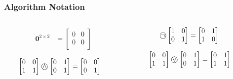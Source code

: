 \documentclass[11pt]{beamer}
\begin{document}
	\begin{frame}
		\frametitle{Algorithm Notation}

		\begin{columns}
			\begin{column}{0.5\textwidth}
				\begin{align*}
					\mathbf{0}^{2\times 2}&=
					\begin{bmatrix}
						0&0\\
						0&0\\
					\end{bmatrix}
				\end{align*}

				\begin{align*}
					\begin{bmatrix}
						0&0\\
						1&1\\
					\end{bmatrix}
					\incircbin{\land}
					\begin{bmatrix}
						0&1\\
						0&1\\
					\end{bmatrix}
					&=
					\begin{bmatrix}
						0&0\\
						0&1\\
					\end{bmatrix}
				\end{align*}
			\end{column}
			\begin{column}{0.5\textwidth}		
				\begin{align*}
					\incircbin{\neg}
					\begin{bmatrix}
						1&0\\
						0&1\\
					\end{bmatrix}&=
					\begin{bmatrix}
						0&1\\
						1&0\\
					\end{bmatrix}
				\end{align*}
				
				\begin{align*}
					\begin{bmatrix}
						0&0\\
						1&1\\
					\end{bmatrix}
					\incircbin{\lor}
					\begin{bmatrix}
						0&1\\
						0&1\\
					\end{bmatrix}
					&=
					\begin{bmatrix}
						0&1\\
						1&1\\
					\end{bmatrix}
				\end{align*}
			\end{column}
		\end{columns}		
	\end{frame}
\end{document}
